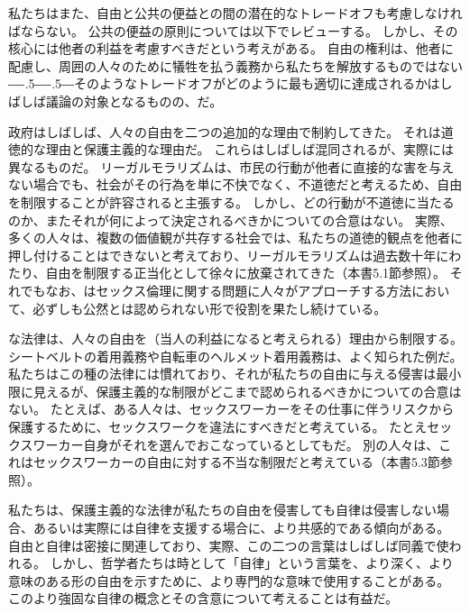\documentclass[paper=a4,book,openany]{jlreq}
\def\DDASH{―\kern-.5\zw―\kern-.5\zw―} %
\begin{document}
私たちはまた、自由と公共の便益との間の潜在的なトレードオフも考慮しなければならない。
公共の便益の原則については以下でレビューする。
しかし、その核心には他者の利益を考慮すべきだという考えがある。
自由の権利は、他者に配慮し、周囲の人々のために犠牲を払う義務から私たちを解放するものではない{\DDASH}そのようなトレードオフがどのように最も適切に達成されるかはしばしば議論の対象となるものの、だ。

政府はしばしば、人々の自由を二つの追加的な理由で制約してきた。
それは道徳的な理由と保護主義的な理由だ。
これらはしばしば混同されるが、実際には異なるものだ。
リーガルモラリズムは、市民の行動が他者に直接的な害を与えない場合でも、社会がその行為を単に不快でなく、不道徳だと考えるため、自由を制限することが許容されると主張する。
しかし、どの行動が不道徳に当たるのか、またそれが何によって決定されるべきかについての合意はない。
実際、多くの人々は、複数の価値観が共存する社会では、私たちの道徳的観点を他者に押し付けることはできないと考えており、リーガルモラリズムは過去数十年にわたり、自由を制限する正当化として徐々に放棄されてきた（本書5.1節参照）。
それでもなお、はセックス倫理に関する問題に人々がアプローチする方法において、必ずしも公然とは認められない形で役割を果たし続けている。

な法律は、人々の自由を（当人の利益になると考えられる）理由から制限する。
シートベルトの着用義務や自転車のヘルメット着用義務は、よく知られた例だ。
私たちはこの種の法律には慣れており、それが私たちの自由に与える侵害は最小限に見えるが、保護主義的な制限がどこまで認められるべきかについての合意はない。
たとえば、ある人々は、セックスワーカーをその仕事に伴うリスクから保護するために、セックスワークを違法にすべきだと考えている。
たとえセックスワーカー自身がそれを選んでおこなっているとしてもだ。
別の人々は、これはセックスワーカーの自由に対する不当な制限だと考えている（本書5.3節参照）。

私たちは、保護主義的な法律が私たちの自由を侵害しても自律は侵害しない場合、あるいは実際には自律を支援する場合に、より共感的である傾向がある。
自由と自律は密接に関連しており、実際、この二つの言葉はしばしば同義で使われる。
しかし、哲学者たちは時として「自律」という言葉を、より深く、より意味のある形の自由を示すために、より専門的な意味で使用することがある。
このより強固な自律の概念とその含意について考えることは有益だ。
\end{document}
